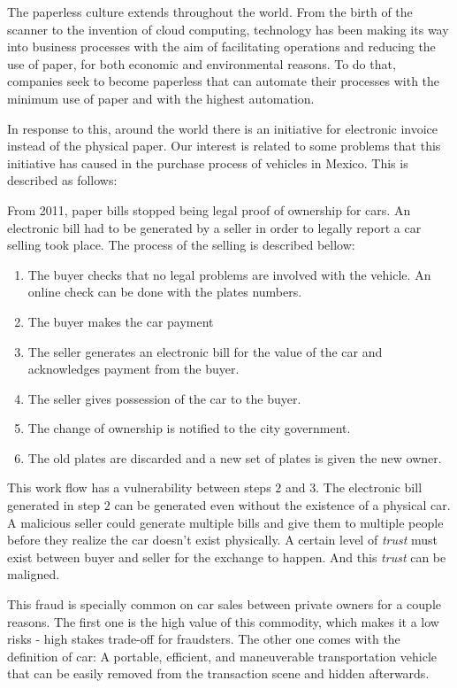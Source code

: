 The paperless culture extends throughout the world. From the birth of the scanner to the invention 
of cloud computing, technology has been making its way into business processes with the aim of
facilitating operations and reducing the use of paper, for both economic and environmental reasons. 
To do that, companies seek to become paperless that can automate their processes with the 
minimum use of paper and with the highest automation.

In response to this, around the world there is an initiative for electronic invoice instead of the physical paper. 
Our interest is related to some problems that this initiative has caused in the 
purchase process of vehicles in Mexico. This is described as follows:

From 2011, paper bills stopped being legal proof of ownership for cars. An electronic bill had to be generated by a seller in order to legally report a car selling took place.
The process of the selling is described bellow:
\begin{enumerate}
    \item The buyer checks that no legal problems are involved with the vehicle. An online check can be done with the plates numbers. 
    \item The buyer makes the car payment
    \item The seller generates an electronic bill for the value of the car and acknowledges payment from the buyer.
    \item The seller gives possession of the car to the buyer.
    \item The change of ownership is notified to the city government. 
    \item The old plates are discarded and a new set of plates is given the new owner.
\end{enumerate}

This work flow has a vulnerability between steps $2$ and $3$. The electronic bill generated in step $2$ can be generated even without the existence of a physical car. A malicious seller could generate multiple bills and give them to multiple people before they realize the car doesn't exist physically. A certain level of \textit{trust} must exist between buyer and seller for the exchange to happen. And this \textit{trust} can be maligned. 

This fraud is specially common on car sales between private owners for a couple reasons. The first one is the high value of this commodity, which makes it a low risks - high stakes trade-off for fraudsters. The other one comes with the definition of car: A portable, efficient, and maneuverable transportation vehicle that can be easily removed from the transaction scene and hidden afterwards.

